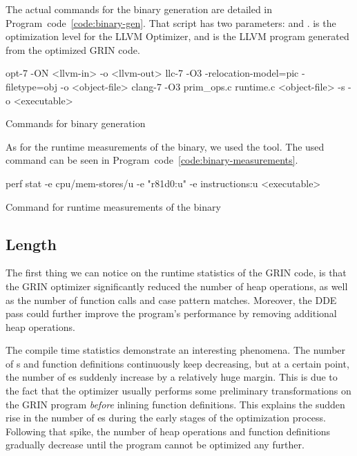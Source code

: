 \documentclass[main.tex]{subfiles}
\begin{document}
	The actual commands for the binary generation are detailed in Program~code~\ref{code:binary-gen}. That script has two parameters:  and .  is the optimization level for the LLVM Optimizer, and  is the LLVM program generated from the optimized GRIN code.
	
	\begin{codeFloat}[H]
		\begin{bash}
			opt-7 -ON <llvm-in> -o <llvm-out> 
			llc-7 -O3 -relocation-model=pic -filetype=obj -o <object-file>
			clang-7 -O3 prim_ops.c runtime.c <object-file> -s -o <executable>
		\end{bash}
		\caption{Commands for binary generation}
		\label{code:binary-gen}
	\end{codeFloat}
	
	As for the runtime measurements of the binary, we used the  tool. The used command can be seen in Program~code~\ref{code:binary-measurements}.

	\begin{codeFloat}[H]
		\begin{bash}
			perf stat -e cpu/mem-stores/u -e "r81d0:u" -e instructions:u <executable>
		\end{bash}
		\caption{Command for runtime measurements of the binary}
		\label{code:binary-measurements}
	\end{codeFloat}
	
	
	\subsection{Length}
	
	The first thing we can notice on the runtime statistics of the GRIN code, is that the GRIN optimizer significantly reduced the number of heap operations, as well as the number of function calls and case pattern matches. Moreover, the DDE pass could further improve the program's performance by removing additional heap operations.
	
	The compile time statistics demonstrate an interesting phenomena. The number of s and function definitions continuously keep decreasing, but at a certain point, the number of es suddenly increase by a relatively huge margin. This is due to the fact that the optimizer usually performs some preliminary transformations on the GRIN program \emph{before} inlining function definitions. This explains the sudden rise in the number of es during the early stages of the optimization process. Following that spike, the number of heap operations and function definitions gradually decrease until the program cannot be optimized any further.
	
\end{document}
